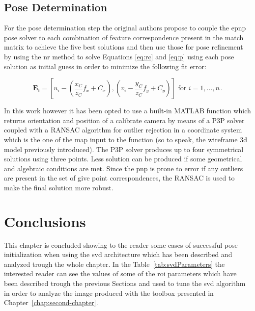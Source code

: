 \subsection{Pose Determination}
For the pose determination step the original authors propose to couple the e\acrshort{pnp} pose solver \cite{10.1007/s11263-008-0152-6} to each combination of feature correspondence present in the match matrix to achieve the five best solutions and then use those for pose refinement by using the \acrshort{nr} method to solve Equations \eqref{eq:rc} and \eqref{eq:p} using each pose solution as initial guess in order to minimize the following fit error:

\begin{equation}
  \mathbf{E_i} = \left[u_i - \left( \frac{x_C}{z_C} f_x + C_x \right) , \left( v_i - \frac{y_C}{z_C} f_y + C_y \right) \right]  \mbox{ for } i=1,...,n \,.
  \label{eq:errorFIT}
\end{equation}

In this work however it has been opted to use a built-in MATLAB function which returns orientation and position of a calibrate camera by means of a P3P solver \cite{XiaoShanGao2003} coupled with a RANSAC algorithm for outlier rejection \cite{Torr2000} in a coordinate system which is the one of the map input to the function (so to speak, the wireframe \acrshort{3d} model previously introduced). The P3P solver produces up to four symmetrical solutions using three points. Less solution can be produced if some geometrical and algebraic conditions are met.
Since the \acrshort{pnp} is prone to error if any outliers are present in the set of give point correspondences, the RANSAC is used to make the final solution more robust.

\section{Conclusions}
This chapter is concluded showing to the reader some cases of successful pose initialization when using the \acrshort{svd} architecture which has been described and analyzed trough the whole chapter. In the Table~\ref{tab:svdParameters} the interested reader can see the values of some of the \acrshort{roi} parameters which have been described trough the previous Sections and used to tune the \acrshort{svd} algorithm in order to analyze the image produced with the toolbox presented in Chapter~\ref{chap:second-chapter}.

